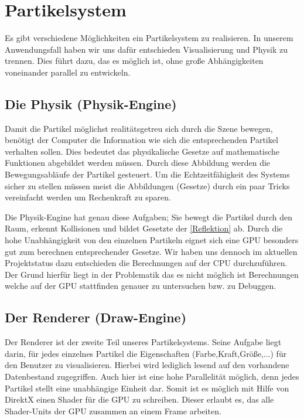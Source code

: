 \section{Partikelsystem}
\begin{Spacing}{\mylinespace}

Es gibt verschiedene Möglichkeiten ein Partikelsystem zu realisieren.
In unserem Anwendungsfall haben wir uns dafür entschieden Visualisierung und Physik zu trennen.
Dies führt dazu, das es möglich ist, ohne große Abhängigkeiten voneinander parallel zu entwickeln.

\subsection{Die Physik (Physik-Engine)}
Damit die Partikel möglichst realitätsgetreu sich durch die Szene bewegen, benötigt der Computer die Information wie sich die entsprechenden Partikel verhalten sollen.
Dies bedeutet das physikalische Gesetze auf mathematische Funktionen abgebildet werden müssen.
Durch diese Abbildung werden die Bewegungsabläufe der Partikel gesteuert.
Um die Echtzeitfähigkeit des Systems sicher zu stellen müssen meist die Abbildungen (Gesetze) durch ein paar Tricks vereinfacht werden um Rechenkraft zu sparen.

Die Physik-Engine hat genau diese Aufgaben; Sie bewegt die Partikel durch den Raum, erkennt Kollisionen und bildet Gesetzte der \ref{Reflektion} ab.
Durch die hohe Unabhängigkeit von den einzelnen Partikeln eignet sich eine GPU besonders gut zum berechnen entsprechender Gesetze.
Wir haben uns dennoch im aktuellen Projektstatus dazu entschieden die Berechnungen auf der CPU durchzuführen.
Der Grund hierfür liegt in der Problematik das es nicht möglich ist Berechnungen welche auf der GPU stattfinden genauer zu untersuchen bzw. zu Debuggen.

\subsection{Der Renderer (Draw-Engine)}
Der Renderer ist der zweite Teil unseres Partikelsystems. Seine Aufgabe liegt darin, für jedes einzelnes Partikel die Eigenschaften (Farbe,Kraft,Größe,...) für den Benutzer zu visualisieren.
Hierbei wird lediglich lesend auf den vorhandene Datenbestand zugegriffen.
Auch hier ist eine hohe Parallelität möglich, denn jedes Partikel stellt eine unabhängige Einheit dar.
Somit ist es möglich mit Hilfe von DirektX einen Shader für die GPU zu schreiben. 
Dieser erlaubt es, das alle Shader-Units der GPU zusammen an einem Frame arbeiten. 

\end{Spacing}
\newpage
\clearpage
